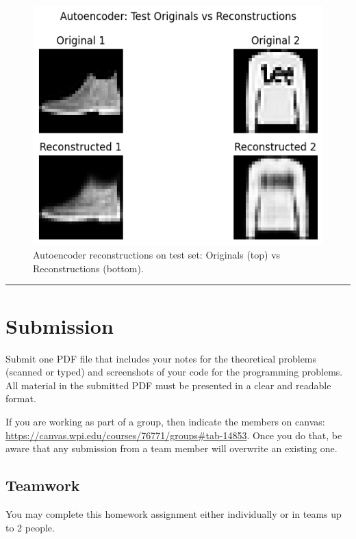 \documentclass[
  letterpaper,
  DIV=11,
  numbers=noendperiod]{scrartcl}
\begin{document}
\begin{figure}[H]

{\centering \includegraphics{CS541_HW3_git_files/figure-latex/cs541_hw3_p4_d1a-task4-output-1.png}

}

\caption{Autoencoder reconstructions on test set: Originals (top) vs
Reconstructions (bottom).}

\end{figure}%

\begin{center}\rule{0.5\linewidth}{0.5pt}\end{center}

\section{Submission}\label{submission}

Submit one PDF file that includes your notes for the theoretical
problems (scanned or typed) and screenshots of your code for the
programming problems. All material in the submitted PDF must be
presented in a clear and readable format.

If you are working as part of a group, then indicate the members on
canvas:
\href{https://www.google.com/search?q=https://canvas.wpi.edu/courses/76771/groups\%23tab-14853}{https://canvas.wpi.edu/courses/76771/groups\#tab-14853}.
Once you do that, be aware that any submission from a team member will
overwrite an existing one.

\subsection{Teamwork}\label{teamwork}

You may complete this homework assignment either individually or in
teams up to 2 people.
\end{document}
